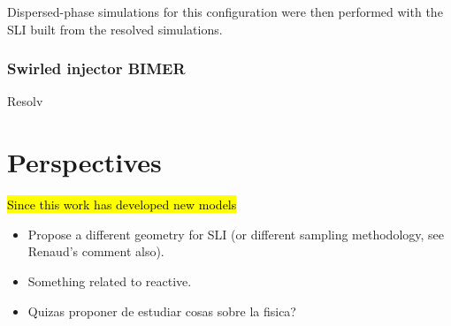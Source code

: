 Dispersed-phase simulations for this configuration were then performed with the SLI built from the resolved simulations. 

\subsubsection*{Swirled injector BIMER}

Resolv



\section*{Perspectives}

\hl{Since this work has developed new models}

\begin{itemize}

	\item Propose a different geometry for SLI (or different sampling methodology, see Renaud's comment also).
	
	\item Something related to reactive.
	
	\item Quizas proponer de estudiar cosas sobre la fisica?

\end{itemize}
